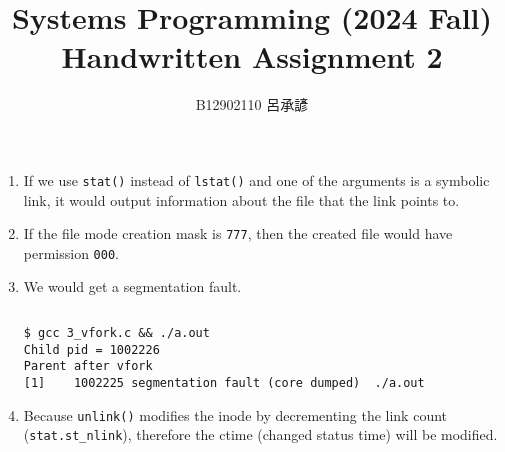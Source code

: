 \documentclass[12pt, a4paper]{article}
\title{
  \vspace{-1cm}
  Systems Programming (2024 Fall)\\
  Handwritten Assignment 2
}
\author{\Large B12902110 呂承諺}
\date{}
\begin{document}
  \maketitle
  \begin{enumerate}
    \item If we use \verb|stat()| instead of \verb|lstat()| and one of the arguments is
    a symbolic link, it would output information about the file that the link points to.

    \item If the file mode creation mask is \verb|777|, then the created file would have
    permission \verb|000|.

    \item We would get a segmentation fault.
    \inputminted[label=\footnotesize3\_vfork.c]{c}{3_vfork.c}
    \begin{Verbatim}[fontsize=\footnotesize, frame=single]
$ gcc 3_vfork.c && ./a.out
Child pid = 1002226
Parent after vfork
[1]    1002225 segmentation fault (core dumped)  ./a.out
    \end{Verbatim}

    \item Because \verb|unlink()| modifies the inode by decrementing the link count (\verb|stat.st_nlink|),
    therefore the ctime (changed status time) will be modified.
  \end{enumerate}
\end{document}

